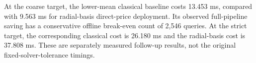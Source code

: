 At the coarse target, the lower-mean classical baseline costs 13.453 ms, compared with 9.563 ms for radial-basis direct-price deployment. Its observed full-pipeline saving has a conservative offline break-even count of 2,546 queries. At the strict target, the corresponding classical cost is 26.180 ms and the radial-basis cost is 37.808 ms. These are separately measured follow-up results, not the original fixed-solver-tolerance timings.
